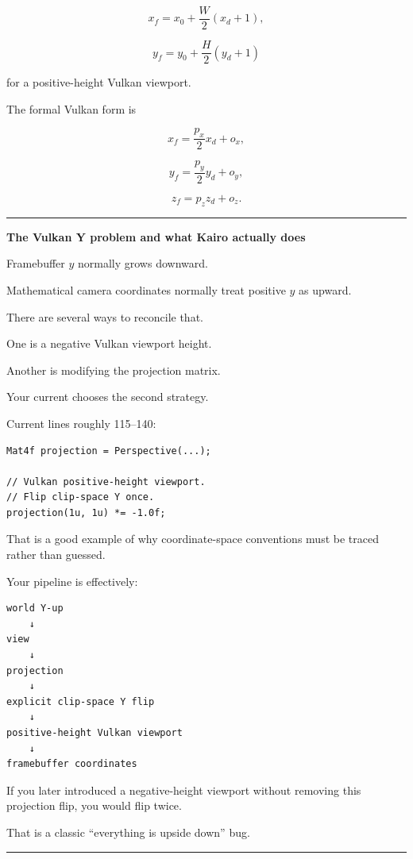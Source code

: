 \[
x_f=x_0+\frac{W}{2}(x_d+1),
\]

\[
y_f=y_0+\frac{H}{2}(y_d+1)
\]

for a positive-height Vulkan viewport.

The formal Vulkan form is

\[
x_f=\frac{p_x}{2}x_d+o_x,
\]

\[
y_f=\frac{p_y}{2}y_d+o_y,
\]

\[
z_f=p_z z_d+o_z.
\]

\begin{center}\rule{0.5\linewidth}{0.5pt}\end{center}

\textbf{The Vulkan Y problem and what Kairo actually does}

Framebuffer \(y\) normally grows downward.

Mathematical camera coordinates normally treat positive \(y\) as upward.

There are several ways to reconcile that.

One is a negative Vulkan viewport height.

Another is modifying the projection matrix.

Your current  chooses the second strategy.

Current lines roughly 115--140:

\begin{verbatim}
Mat4f projection = Perspective(...);

// Vulkan positive-height viewport.
// Flip clip-space Y once.
projection(1u, 1u) *= -1.0f;
\end{verbatim}

That is a good example of why coordinate-space conventions must be traced rather than guessed.

Your pipeline is effectively:

\begin{verbatim}
world Y-up
    ↓
view
    ↓
projection
    ↓
explicit clip-space Y flip
    ↓
positive-height Vulkan viewport
    ↓
framebuffer coordinates
\end{verbatim}

If you later introduced a negative-height viewport without removing this projection flip, you would flip twice.

That is a classic ``everything is upside down'' bug.

\begin{center}\rule{0.5\linewidth}{0.5pt}\end{center}


